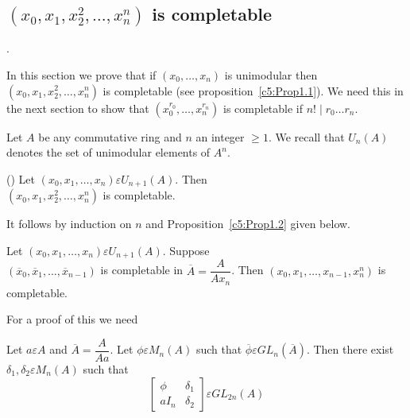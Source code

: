 \chapter{}\label{chap5}

\section{\texorpdfstring{$\left(x_0,x_1,x^{2}_2,\ldots,x^{n}_n\right)$}{eq} is completable}.\label{c5:s1}

In this section we prove that if $(x_0,\ldots,x_n)$ is unimodular then\\
$\left(x_0,x_1,x^{2}_2,\ldots,x^{n}_n\right)$ is completable (see
proposition~\ref{c5:Prop1.1}). We need this in the next section to
show that $\left(x^{r_0}_0,\ldots,x^{r_n}_n\right)$ is completable if
$n!\mid r_0\ldots r_n$.

Let $A$ be any commutative ring and $n$ an integer $\geq 1$. We recall
that $U_n(A)$ denotes the set of unimodular elements of $A^{n}$.  

\begin{Prop}(\citet{Suslinc})\label{c5:Prop1.1}
Let $(x_0,x_1,\ldots,x_n)\varepsilon U_{n+1}(A)$. Then\\
$\left(x_0,x_1,x_2^{2},\ldots, x^{n}_n\right)$ is completable.
\end{Prop}

\begin{Proof}
It follows by induction on $n$ and Proposition~\ref{c5:Prop1.2} given below.
\enprf
\end{Proof}

\begin{Prop}\label{c5:Prop1.2}
Let $(x_0,x_1,\ldots,x_n)\varepsilon U_{n+1}(A)$. Suppose\\
$\left(\overline{x}_0,\overline{x}_1,\ldots,\overline{x}_{n-1}\right)$
is completable in $\overline{A}=\dfrac{A}{Ax_n}$. Then
$\left(x_0,x_1,\ldots,x_{n-1},x^{n}_n\right)$ is completable.
\end{Prop}

For a proof of this we need

\begin{lem}\label{c5:lem1.3}
Let $a\varepsilon A$ and $\overline{A}=\dfrac{A}{Aa}$. Let
$\phi\varepsilon M_n(A)$ such that $\overline{\phi}\varepsilon
GL_n(\overline{A})$. Then there exist $\delta_1,\delta_2\varepsilon
M_n(A)$ such that 
$$
\begin{bmatrix}
\phi & \delta_1\\
aI_n& \delta_2
\end{bmatrix} \varepsilon GL_{2n}(A)
$$
\end{lem}

